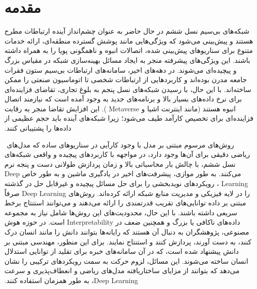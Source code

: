 \chapter{مقدمه}
\label{chap:intro}

‫شبکه‌های بی‌سیم نسل ششم در حال حاضر به عنوان چشم‌انداز آینده ارتباطات مطرح هستند و پیش‌بینی می‌شود که ویژگی‌هایی مانند پوشش گسترده منطقه‌ای، ارائه خدمات متنوع برای سناریوهای پیش‌بینی شده، اتصالات انبوه و ناهمگونی پویا را به همراه داشته باشند. این ویژگی‌های پیشرفته منجر به ایجاد مسائل بهینه‌سازی شبکه در مقیاس بزرگ و پیچیده‌ای می‌شوند. در دهه‌های اخیر، سامانه‌های ارتباطات بی‌سیم ستون فقرات جامعه مدرن بوده‌اند و کاربردهایی از ارتباطات شخصی تا اتوماسیون صنعتی را ممکن ساخته‌اند. با این حال، با رسیدن شبکه‌های نسل پنجم
 به بلوغ تجاری، تقاضای فزاینده‌ای برای نرخ داده‌های بسیار بالا و برنامه‌های جدید به وجود آمده است که نیازمند اتصال انبوه هستند (مانند اینترنت اشیا 
  و 
\gls{Metaverse}
  ). این افزایش تقاضا منجر به رقابت فزاینده‌ای برای تخصیص کارآمد طیف می‌شود؛ زیرا شبکه‌های آینده باید حجم عظیمی از داده‌ها را پشتیبانی کنند.‬

‫‬
‫روش‌های مرسوم مبتنی بر مدل با وجود کارآیی در سناریوهای ساده که مدل‌های ریاضی دقیقی برای آن‌ها وجود دارد، در مواجهه با کاربردهای پیچیده و واقعی شبکه‌های نسل ششم، با چالش بار محاسباتی بالا و زمان‌ پردازش طولانی دست و پنجه نرم می‌کنند. به طور موازی، پیشرفت‌های اخیر در یادگیری ماشین و به طور خاص 
\gls{Deep Learning}
، رویکردهای نویدبخشی را برای حل مسائل پیچیده و غیرقابل حل در گذشته را در لایه فیزیکی و مدیریت منابع شبکه ارائه کرده‌اند. روش‌های 
\gls{Deep Learning}
صرفاً مبتنی بر داده توانایی‌های تقریب قدرتمندی را ارائه می‌دهند و می‌توانند استنتاج برخط سریعی داشته باشند. با این حال، محدودیت‌های این روش‌ها شامل نیاز به مجموعه داده‌های ناکافی یا بزرگ و همچنین ضعف در
\gls{Interpretability}
 است. در حوزه هوش مصنوعی، پژوهشگران به دنبال آن هستند که رایانه‌ها بتوانند دانش را مانند انسان درک کنند، به دست آورند، پردازش کنند و استنتاج نمایند. برای این منظور، مهندسی مبتنی بر دانش پیشنهاد شده است، که در آن سامانه‌های خبره برای تقلید از توانایی استدلال انسان ساخته می‌شوند. این مسائل، لزوم حرکت به سمت رویکردهای ترکیبی را نشان می‌دهد که بتوانند از مزایای ساختاریافته مدل‌های ریاضی و انعطاف‌پذیری و سرعت 
\gls{Deep Learning}،
 به طور همزمان استفاده کنند.‬

